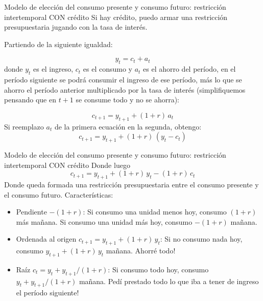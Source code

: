 \documentclass{beamer}
\begin{document}
\begin{frame}{Modelo de elección del consumo presente y consumo futuro: restricción intertemporal CON crédito}
    Si hay crédito, puedo armar una restricción presupuestaria jugando con la tasa de interés.

    Partiendo de la siguiente igualdad:

    \[y_t = c_t + a_t\]
    donde \(y_t\) es el ingreso, \(c_t\) es el consumo y \(a_t\) es el ahorro del período, en el período siguiente se podrá consumir el ingreso de ese período, más lo que se ahorro el período anterior multiplicado por la tasa de interés (simplifiquemos pensando que en $t+1$ se consume todo y no se ahorra):

    \[c_{t+1} = y_{t+1} + (1+r)\,a_t\]
    Si reemplazo $a_t$ de la primera ecuación en la segunda, obtengo:
    \[c_{t+1} = y_{t+1} + (1+r)\,(y_t - c_t)\]
\end{frame}

\begin{frame}{Modelo de elección del consumo presente y consumo futuro: restricción intertemporal CON crédito}
    Donde luego
    \[c_{t+1} = y_{t+1} + (1+r)\,y_t - (1+r)\,c_t\]
    Donde queda formada una restricción presupuestaria entre el consumo presente y el consumo futuro. Características:
    \begin{itemize}
        \item Pendiente $-(1+r)$: Si consumo una unidad menos hoy, consumo $(1+r)$ más mañana. Si consumo una unidad más hoy, consumo $-(1+r)$ mañana.
        \item Ordenada al origen $c_{t+1} = y_{t+1} + (1+r)\,y_t$: Si no consumo nada hoy, consumo $y_{t+1} + (1+r)\,y_t$ mañana. Ahorré todo!
        \item Raíz $c_t = y_t + y_{t+1}/(1+r)$: Si consumo todo hoy, consumo $y_t + y_{t+1}/(1+r)$ mañana. Pedí prestado todo lo que iba a tener de ingreso el período siguiente!
    \end{itemize}
\end{frame}
\end{document}
